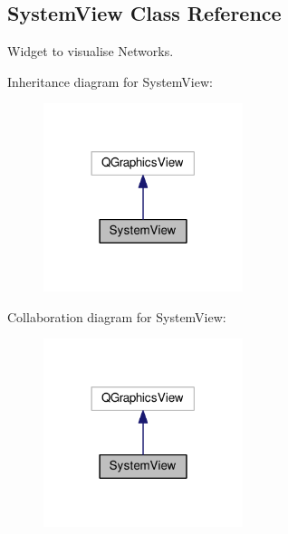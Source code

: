 \hypertarget{class_system_view}{}\subsection{System\+View Class Reference}
\label{class_system_view}


Widget to visualise Networks.  




Inheritance diagram for System\+View\+:
\nopagebreak
\begin{figure}[H]
\begin{center}
\leavevmode
\includegraphics[width=165pt]{class_system_view__inherit__graph}
\end{center}
\end{figure}


Collaboration diagram for System\+View\+:
\nopagebreak
\begin{figure}[H]
\begin{center}
\leavevmode
\includegraphics[width=165pt]{class_system_view__coll__graph}
\end{center}
\end{figure}
